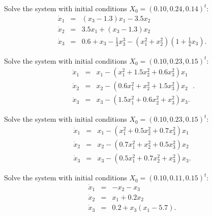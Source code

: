 \documentclass{ximera}
\begin{document}
\begin{exercise}  \label{c11.6.1d}
Solve the system  with initial conditions 
$X_0 = (0.10, 0.24, 0.14)^t$:
\begin{equation*} \label{e11.6.1d}
\begin{array}{rcl} 
\dot{x}_1 & = &   (x_3 - 1.3)x_1 - 3.5x_2 \\
\dot{x}_2 & = & 3.5x_1 + (x_3-1.3)x_2  \\
\dot{x}_3 & = &
0.6+x_3-\frac{1}{3}x_3^3-(x_1^2+x_2^2)(1+\frac{1}{4}x_3).\end{array}
\end{equation*}
\end{exercise}

\begin{exercise}  \label{c11.6.1c}
Solve the system  with initial conditions 
$X_0 = (0.10, 0.23, 0.15)^t$:
\begin{equation*} \label{e11.6.1c}
\begin{array}{rcl} 
\dot{x}_1 & = & x_1 - (x_1^2 + 1.5x_2^2 + 0.6x_3^2)x_1 \\
\dot{x}_2 & = & x_2 - (0.6x_1^2 + x_2^2 + 1.5x_3^2)x_2  \\
\dot{x}_3 & = & x_3 - (1.5x_1^2 + 0.6x_2^2 + x_3^2)x_3.   \end{array}. 
\end{equation*}
\end{exercise}

\begin{exercise}  \label{c11.6.1b}
Solve the system  with initial conditions 
$X_0 = (0.10, 0.23, 0.15)^t$:
\begin{equation*} \label{e11.6.1b}
\begin{array}{rcl} 
\dot{x}_1 & = & x_1 - (x_1^2 + 0.5x_2^2 + 0.7x_3^2)x_1 \\
\dot{x}_2 & = & x_2 - (0.7x_1^2 + x_2^2 + 0.5x_3^2)x_2  \\
\dot{x}_3 & = & x_3 - (0.5x_1^2 + 0.7x_2^2 + x_3^2)x_3.   \end{array}
\end{equation*}
\end{exercise}

\begin{exercise}  \label{c11.6.1e}             
Solve the system  with initial conditions 
$X_0 = (0.10, 0.11, 0.15)^t$:
\begin{equation*} \label{e11.6.1e}
\begin{array}{rcl} 
\dot{x}_1 & = & -x_2-x_3  \\
\dot{x}_2 & = &  x_1 + 0.2x_2 \\
\dot{x}_3 & = & 0.2 + x_3(x_1 - 5.7). \end{array}
\end{equation*}
\end{exercise}
\end{document}
